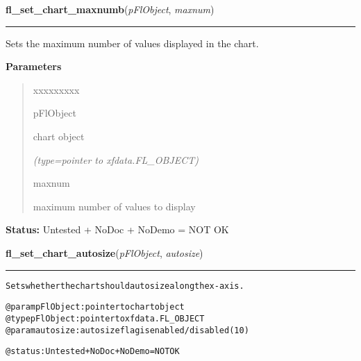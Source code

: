 \hspace{.8\funcindent}\begin{boxedminipage}{\funcwidth}

    \raggedright \textbf{fl\_set\_chart\_maxnumb}(\textit{pFlObject}, \textit{maxnum})

    \vspace{-1.5ex}

    \rule{\textwidth}{0.5\fboxrule}
\setlength{\parskip}{2ex}
    Sets the maximum number of values displayed in the chart.

\setlength{\parskip}{1ex}
      \textbf{Parameters}
      \vspace{-1ex}

      \begin{quote}
        \begin{Ventry}{xxxxxxxxx}

          \item[pFlObject]

          chart object

            {\it (type=pointer to xfdata.FL\_OBJECT)}

          \item[maxnum]

          maximum number of values to display

        \end{Ventry}

      \end{quote}

\textbf{Status:} Untested + NoDoc + NoDemo = NOT OK



    \end{boxedminipage}

    \label{xformslib:flchart:fl_set_chart_autosize}

    \vspace{0.5ex}

\hspace{.8\funcindent}\begin{boxedminipage}{\funcwidth}

    \raggedright \textbf{fl\_set\_chart\_autosize}(\textit{pFlObject}, \textit{autosize})

    \vspace{-1.5ex}

    \rule{\textwidth}{0.5\fboxrule}
\setlength{\parskip}{2ex}
\begin{alltt}
        Sets whether the chart should autosize along the x-axis.

        @param pFlObject: pointer to chart object
@type pFlObject: pointer to xfdata.FL\_OBJECT
        @param autosize: autosize flag is enabled/disabled (1{\textbar}0)

        @status: Untested + NoDoc + NoDemo = NOT OK
    
\end{alltt}

\setlength{\parskip}{1ex}
    \end{boxedminipage}

